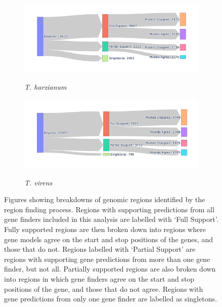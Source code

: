 \begin{figure}
  \ContinuedFloat
  \centering
  \begin{subfigure}{0.9\textwidth}
    \includegraphics[width=\textwidth]{figures/t-harzianum-region-breakdown.png}
    \label{fig:t-harzianum-regions}
    \caption{\textit{T. harzianum}}
  \end{subfigure}
  \begin{subfigure}{0.9\textwidth}
    \includegraphics[width=\textwidth]{figures/t-virens-region-breakdown.png}
    \label{fig:t-virens-regions}
    \caption{\textit{T. virens}}
  \end{subfigure}
  \caption[Breakdown of identified regions]{Figures showing breakdowns
    of genomic regions identified by the region finding
    process. Regions with supporting predictions from all gene finders
    included in this analysis are labelled with `Full Support'. Fully
    supported regions are then broken down into regions where gene
    models agree on the start and stop positions of the genes, and
    those that do not. Regions labelled with `Partial Support' are
    regions with supporting gene predictions from more than one gene
    finder, but not all. Partially supported regions are also broken
    down into regions in which gene finders agree on the start and
    stop positions of the gene, and those that do not agree. Regions
    with gene predictions from only one gene finder are labelled as
    singletons.}
  \label{fig:regions-sankey}
\end{figure}

